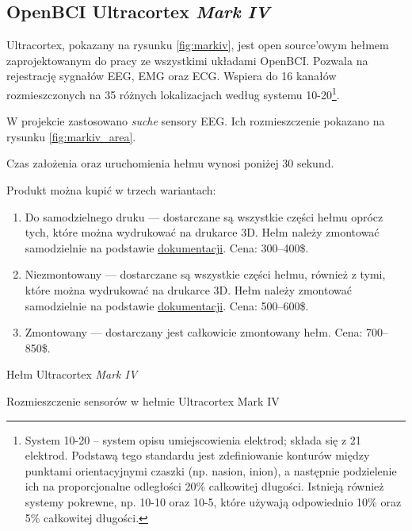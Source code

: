 \documentclass[skorowidz,skroty]{dyplomWEZUT}
\begin{document}
\FloatBarrier
\subsection{OpenBCI Ultracortex \textit{Mark IV}}
Ultracortex, pokazany na rysunku \vref{fig:markiv}, jest open source'owym hełmem zaprojektowanym do pracy ze wszystkimi układami OpenBCI\cite{markiv_shop}. Pozwala na rejestrację sygnałów EEG, EMG oraz ECG. Wspiera do 16 kanałów rozmieszczonych na 35 różnych lokalizacjach według systemu 10-20\footnote{System 10-20 -- system opisu umiejscowienia elektrod; składa się z 21 elektrod. Podstawą tego standardu jest zdefiniowanie konturów między punktami orientacyjnymi czaszki (np. nasion, inion), a następnie podzielenie ich na proporcjonalne odległości 20\% całkowitej długości. Istnieją również systemy pokrewne, np. 10-10 oraz 10-5, które używają odpowiednio 10\% oraz 5\% całkowitej długości\cite[rozdz. 6]{wolpaw2012brain}.}.

W projekcie zastosowano \textit{suche} sensory EEG. Ich rozmieszczenie pokazano na rysunku \vref{fig:markiv_area}.

Czas założenia oraz uruchomienia hełmu wynosi poniżej 30 sekund.

Produkt można kupić w trzech wariantach:
\begin{enumerate}
    \item Do samodzielnego druku --- dostarczane są wszystkie części hełmu oprócz tych, które można wydrukować na drukarce 3D. Hełm należy zmontować samodzielnie na podstawie \href{https://docs.openbci.com/Headware/01-Ultracortex-Mark-IV#ultracortex-mark-iv-assembly-instructions}{dokumentacji}. Cena: 300--400\$.
    \item Niezmontowany --- dostarczane są wszystkie części hełmu, również z tymi, które można wydrukować na drukarce 3D. Hełm należy zmontować samodzielnie na podstawie \href{https://docs.openbci.com/Headware/01-Ultracortex-Mark-IV#ultracortex-mark-iv-assembly-instructions}{dokumentacji}. Cena: 500--600\$.
    \item Zmontowany --- dostarczany jest całkowicie zmontowany hełm. Cena: 700--850\$.
\end{enumerate}

{Hełm Ultracortex \textit{Mark IV}\label{fig:markiv}}
{\cite{markiv}}

{Rozmieszczenie sensorów w hełmie Ultracortex Mark IV\label{fig:markiv_area}}
{\cite{markiv_shop}}

\FloatBarrier
\end{document}
